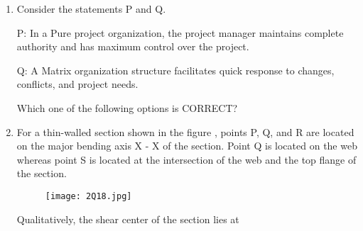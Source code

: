 \documentclass[journal,12pt,onecolumn]{article}
\theoremstyle{remark}
\begin{document}
\begin{enumerate}
    \hfill{}
    \begin{enumerate}
    \end{enumerate}

    \item Consider the statements P and Q.
    
    P: In a Pure project organization, the project manager maintains complete authority
    and has maximum control over the project.
    
    Q: A Matrix organization structure facilitates quick response to changes, conflicts,
    and project needs.
    
    Which one of the following options is CORRECT?
    
    \hfill{}
    \begin{enumerate}
    \end{enumerate}

    \item For a thin-walled section shown in the figure , points P, Q, and R are located on the
    major bending axis X - X of the section. Point Q is located on the web whereas point
    S is located at the intersection of the web and the top flange of the section.
    \begin{figure}[H]
        \centering
        \texttt{[image: 2Q18.jpg]}
        \caption{}
        \label{fig:q18}
    \end{figure}
    
    Qualitatively, the shear center of the section lies at
    
    \hfill{}
    \begin{enumerate}
    \end{enumerate}
    

\end{enumerate}
\end{document}
